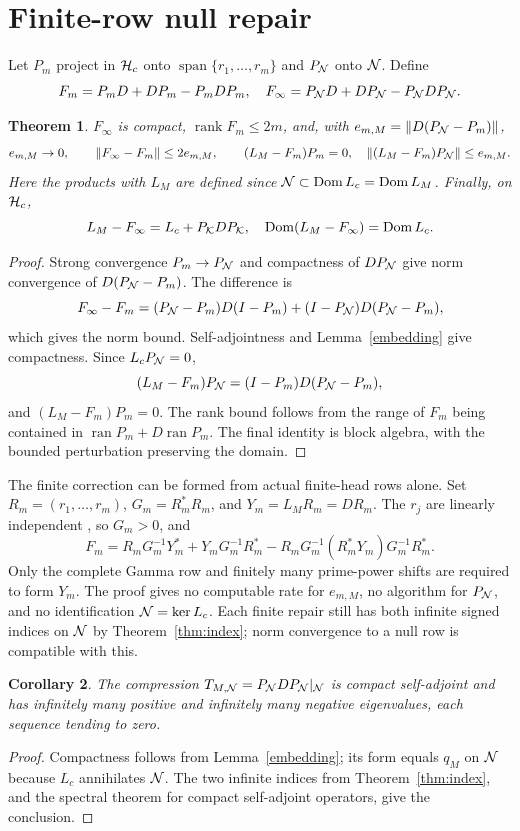 \documentclass[11pt]{article}
\newtheorem{theorem}{Theorem}[section]
\newtheorem{corollary}[theorem]{Corollary}
\begin{document}
\section{Finite-row null repair}\label{repair}
Let $P_m$ project in $\mathcal H_c$ onto $\operatorname{span}\{r_1,\dots,r_m\}$ and $P_\mathcal N$ onto $\mathcal N$. Define
\begin{equation}\label{Fdef}
 F_m=P_mD+DP_m-P_mDP_m,\quad F_\infty=P_\mathcal N D+DP_\mathcal N-P_\mathcal N DP_\mathcal N.
\end{equation}
\begin{theorem}\label{repairthm}
$F_\infty$ is compact, $\operatorname{rank}F_m\le2m$, and, with $e_{m,M}=\lVert D(P_\mathcal N-P_m)\rVert$,
\[e_{m,M}\to0,\qquad \lVert F_\infty-F_m\rVert\le2e_{m,M},\qquad (L_M-F_m)P_m=0,\quad \lVert(L_M-F_m)P_\mathcal N\rVert\le e_{m,M}.\]
Here the products with $L_M$ are defined since $\mathcal N\subset\operatorname{Dom} L_c=\operatorname{Dom} L_M$. Finally, on $\mathcal H_c$,
\[L_M-F_\infty=L_c+P_\mathcal K D P_\mathcal K,\quad \operatorname{Dom}(L_M-F_\infty)=\operatorname{Dom} L_c.\]
\end{theorem}
\begin{proof}
Strong convergence $P_m\to P_\mathcal N$ and compactness of $DP_\mathcal N$ give norm convergence of $D(P_\mathcal N-P_m)$. The difference is
\[F_\infty-F_m=(P_\mathcal N-P_m)D(I-P_m)+(I-P_\mathcal N)D(P_\mathcal N-P_m),\]
which gives the norm bound. Self-adjointness and Lemma~\ref{embedding} give compactness. Since $L_cP_\mathcal N=0$,
\[(L_M-F_m)P_\mathcal N=(I-P_m)D(P_\mathcal N-P_m),\]
and $(L_M-F_m)P_m=0$. The rank bound follows from the range of $F_m$ being contained in $\operatorname{ran}P_m+D\operatorname{ran}P_m$. The final identity is block algebra, with the bounded perturbation preserving the domain.
\end{proof}
The finite correction can be formed from actual finite-head rows alone. Set $R_m=(r_1,\ldots,r_m)$, $G_m=R_m^*R_m$, and $Y_m=L_MR_m=DR_m$. The $r_j$ are linearly independent \cite{source}, so $G_m>0$, and
\begin{equation}\label{rows}
 F_m=R_mG_m^{-1}Y_m^*+Y_mG_m^{-1}R_m^*-R_mG_m^{-1}(R_m^*Y_m)G_m^{-1}R_m^*.
\end{equation}
Only the complete Gamma row and finitely many prime-power shifts are required to form $Y_m$. The proof gives no computable rate for $e_{m,M}$, no algorithm for $P_\mathcal N$, and no identification $\mathcal N=\ker L_c$. Each finite repair still has both infinite signed indices on $\mathcal N$ by Theorem~\ref{thm:index}; norm convergence to a null row is compatible with this.

\begin{corollary}
The compression $T_{M,\mathcal N}=P_\mathcal N D P_\mathcal N|_{\mathcal N}$ is compact self-adjoint and has infinitely many positive and infinitely many negative eigenvalues, each sequence tending to zero.
\end{corollary}
\begin{proof}
Compactness follows from Lemma~\ref{embedding}; its form equals $q_M$ on $\mathcal N$ because $L_c$ annihilates $\mathcal N$. The two infinite indices from Theorem~\ref{thm:index}, and the spectral theorem for compact self-adjoint operators, give the conclusion.
\end{proof}
\end{document}
